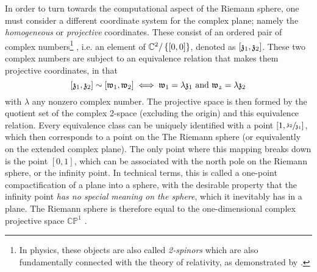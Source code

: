 In order to turn towards the computational aspect of the Riemann sphere, one must consider a different coordinate system for the complex plane; namely the \emph{homogeneous} or \emph{projective} coordinates. These consist of an ordered pair of complex numbers\footnote{In physics, these objects are also called \emph{2-spinors} which are also fundamentally connected with the theory of relativity, as demonstrated by \cite{Penrose1984}.} , i.e. an element of \(\mathbb{C}^2/\left\{[0, 0]\right\}\),  denoted as \(\qty[\mathfrak{z}_1, \mathfrak{z}_2]\). These two complex numbers are subject to an equivalence relation that makes them projective coordinates, in that \[\qty[\mathfrak{z}_1, \mathfrak{z}_2] \sim \qty[\mathfrak{w}_1, \mathfrak{w}_2] \iff \mathfrak{w}_1 = \lambda \mathfrak{z}_1 \text{ and } \mathfrak{w_2} = \lambda \mathfrak{z}_2\]
with \(\lambda\) any nonzero complex number. The projective space is then formed by the quotient set of the complex 2-space (excluding the origin) and this equivalence relation. Every equivalence class can be uniquely identified with a point \([1, \sfrac{\mathfrak{z}_2}{\mathfrak{z}_1}]\), which then corresponds to a point on the The Riemann sphere (or equivalently on the extended complex plane). The only point where this mapping breaks down is the point \([0, 1]\), which can be associated with the north pole on the Riemann sphere, or the infinity point. In technical terms, this is called a one-point compactification of a plane into a sphere, with the desirable property that the infinity point \emph{has no special meaning on the sphere}, which it inevitably has in a plane. The Riemann sphere is therefore equal to the one-dimensional complex projective space \(\mathbb{CP}^1\) \cite{Thurston1997}. 

